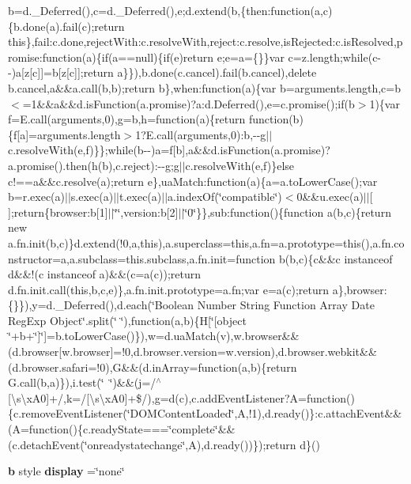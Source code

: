 \begin{DoxyCompactItemize}
b=d.\-\_\-\-Deferred(),c=d.\-\_\-\-Deferred(),e;d.\-extend(b,\{then\-:function(a,c)\{b.\-done(a).\-fail(c);return this\},fail\-:c.\-done,reject\-With\-:c.\-resolve\-With,reject\-:c.\-resolve,is\-Rejected\-:c.\-is\-Resolved,promise\-:function(a)\{if(a==null)\{if(e)return e;e=a=\{\}\}var c=z.\-length;while(c-\/-\/)a[z[c]]=b[z[c]];return a\}\}),b.\-done(c.\-cancel).\-fail(b.\-cancel),delete b.\-cancel,a\&\&a.\-call(b,b);return b\},when\-:function(a)\{var b=arguments.\-length,c=b$<$=1\&\&a\&\&d.\-is\-Function(a.\-promise)?a\-:d.\-Deferred(),e=c.\-promise();if(b$>$1)\{var f=\-E.\-call(arguments,0),g=b,h=function(a)\{return function(b)\{f[a]=arguments.\-length$>$1?\-E.\-call(arguments,0)\-:b,-\/-\/g$|$$|$c.\-resolve\-With(e,f)\}\};while(b-\/-\/)a=f[b],a\&\&d.\-is\-Function(a.\-promise)?a.\-promise().\-then(h(b),c.\-reject)\-:-\/-\/g;g$|$$|$c.\-resolve\-With(e,f)\}else c!==a\&\&c.\-resolve(a);return e\},ua\-Match\-:function(a)\{a=a.\-to\-Lower\-Case();var b=r.\-exec(a)$|$$|$s.\-exec(a)$|$$|$t.\-exec(a)$|$$|$a.\-index\-Of(\char`\"{}compatible\char`\"{})$<$0\&\&u.\-exec(a)$|$$|$[$\,$];return\{browser\-:b[1]$|$$|$\char`\"{}\char`\"{},version\-:b[2]$|$$|$\char`\"{}0\char`\"{}\}\},sub\-:function()\{function a(b,c)\{return new a.\-fn.\-init(b,c)\}d.\-extend(!0,a,this),a.\-superclass=this,a.\-fn=a.\-prototype=this(),a.\-fn.\-constructor=a,a.\-subclass=this.\-subclass,a.\-fn.\-init=function b(b,c)\{c\&\&c instanceof d\&\&!(c instanceof a)\&\&(c=a(c));return d.\-fn.\-init.\-call(this,b,c,e)\},a.\-fn.\-init.\-prototype=a.\-fn;var e=a(c);return a\},browser\-:\{\}\}),y=d.\-\_\-\-Deferred(),d.\-each(\char`\"{}\-Boolean Number String Function Array Date Reg\-Exp Object\char`\"{}.\-split(\char`\"{} \char`\"{}),function(a,b)\{\-H[\char`\"{}[object \char`\"{}+b+\char`\"{}]\char`\"{}]=b.\-to\-Lower\-Case()\}),w=d.\-ua\-Match(v),w.\-browser\&\&(d.\-browser[w.\-browser]=!0,d.\-browser.\-version=w.\-version),d.\-browser.\-webkit\&\&(d.\-browser.\-safari=!0),\-G\&\&(d.\-in\-Array=function(a,b)\{return G.\-call(b,a)\}),i.\-test(\char`\"{} \char`\"{})\&\&(j=/$^\wedge$[\textbackslash{}s\textbackslash{}x\-A0]+/,k=/[\textbackslash{}s\textbackslash{}x\-A0]+\$/),g=d(c),c.\-add\-Event\-Listener?\-A=function()\{c.\-remove\-Event\-Listener(\char`\"{}\-D\-O\-M\-Content\-Loaded\char`\"{},\-A,!1),d.\-ready()\}\-:c.\-attach\-Event\&\&(\-A=function()\{c.\-ready\-State===\char`\"{}complete\char`\"{}\&\&(c.\-detach\-Event(\char`\"{}onreadystatechange\char`\"{},\-A),d.\-ready())\});return d\}()
\item 
{\bf b} style {\bf display} =\char`\"{}none\char`\"{}
\item 

\end{DoxyCompactItemize}
